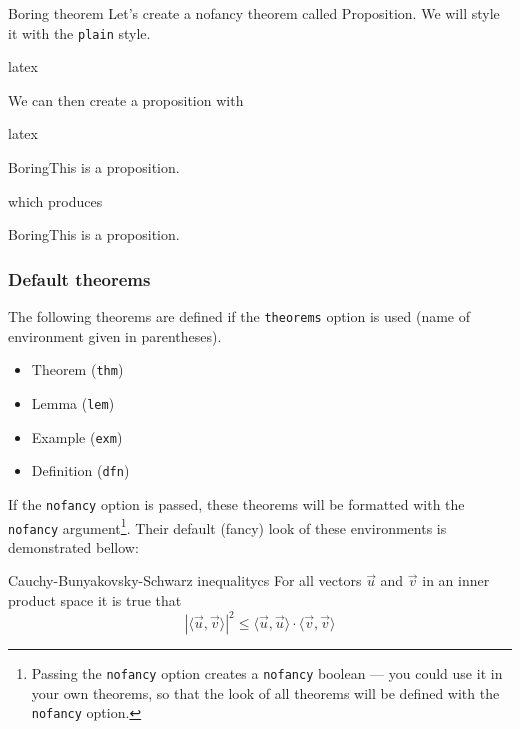 \documentclass{notes}
\begin{document}
\begin{exm}{Boring theorem}{}
Let's create a nofancy theorem called Proposition. We will style it with the \texttt{plain}  style.
\begin{tminted}{latex}
\end{tminted}

We can then create a proposition with
\begin{tminted}{latex}
\begin{prop}{Boring}{}This is a proposition.\end{prop}
\end{tminted}

which produces
\begin{prop}{Boring}{}This is a proposition.\end{prop}
\end{exm}

\subsubsection{Default theorems}
The following theorems are defined if the \texttt{theorems} option is used (name of environment given in parentheses).
\begin{itemize}[nosep]
    \item Theorem (\texttt{thm})
    \item Lemma (\texttt{lem})
    \item Example (\texttt{exm})
    \item Definition (\texttt{dfn})
\end{itemize}

If the \texttt{nofancy} option is passed, these theorems will be formatted with the \texttt{nofancy} argument\footnote{Passing the \texttt{nofancy} option creates a \texttt{nofancy} boolean --- you could use it in your own theorems, so that the look of all theorems will be defined with the \texttt{nofancy} option.}. Their default (fancy) look of these environments is demonstrated bellow: 


\begin{thm}{Cauchy-Bunyakovsky-Schwarz inequality}{cs}
For all vectors $\vec{u}$ and $\vec{v}$ in an inner product space it is true that
\begin{equation}
    \left|\langle\vec{u}, \vec{v}\rangle\right|^2 \leq \langle\vec{u}, \vec{u} \rangle \cdot \langle\vec{v}, \vec{v} \rangle 
\end{equation}
\end{thm}
\end{document}
